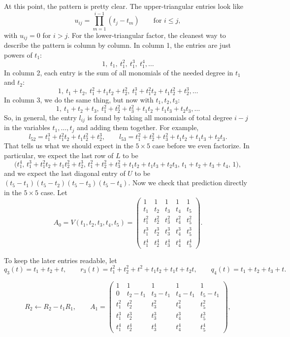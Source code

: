 \documentclass[10pt]{extarticle}
\begin{document}
At this point, the pattern is pretty clear. The upper-triangular entries look like
\begin{equation}
u_{ij}=\prod_{m=1}^{i-1}(t_j-t_m)\qquad \text{for } i\le j,
\label{eq:vander-u}
\end{equation}
with $u_{ij}=0$ for $i>j$. For the lower-triangular factor, the cleanest way to describe the pattern is column by column. In column 1, the entries are just powers of $t_1$:
\[
1,\ t_1,\ t_1^2,\ t_1^3,\ t_1^4,\dots
\]
In column 2, each entry is the sum of all monomials of the needed degree in $t_1$ and $t_2$:
\[
1,\ t_1+t_2,\ t_1^2+t_1t_2+t_2^2,\ t_1^3+t_1^2t_2+t_1t_2^2+t_2^3,\dots
\]
In column 3, we do the same thing, but now with $t_1,t_2,t_3$:
\[
1,\ t_1+t_2+t_3,\ t_1^2+t_2^2+t_3^2+t_1t_2+t_1t_3+t_2t_3,\dots
\]
So, in general, the entry $l_{ij}$ is found by taking all monomials of total degree $i-j$ in the variables $t_1,\dots,t_j$ and adding them together. For example,
\[
l_{52}=t_1^3+t_1^2t_2+t_1t_2^2+t_2^3,
\qquad
l_{53}=t_1^2+t_2^2+t_3^2+t_1t_2+t_1t_3+t_2t_3.
\]
That tells us what we should expect in the $5\times5$ case before we even factorize. In particular, we expect the last row of $L$ to be
\[
\bigl(t_1^4,\,
t_1^3+t_1^2t_2+t_1t_2^2+t_2^3,\,
t_1^2+t_2^2+t_3^2+t_1t_2+t_1t_3+t_2t_3,\,
t_1+t_2+t_3+t_4,\,
1\bigr),
\]
and we expect the last diagonal entry of $U$ to be $(t_5-t_1)(t_5-t_2)(t_5-t_3)(t_5-t_4)$. Now we check that prediction directly in the $5\times5$ case. Let
\begingroup
\small
\[
A_0=V(t_1,t_2,t_3,t_4,t_5)=
\begin{pmatrix}
1 & 1 & 1 & 1 & 1\\
t_1 & t_2 & t_3 & t_4 & t_5\\
t_1^2 & t_2^2 & t_3^2 & t_4^2 & t_5^2\\
t_1^3 & t_2^3 & t_3^3 & t_4^3 & t_5^3\\
t_1^4 & t_2^4 & t_3^4 & t_4^4 & t_5^4
\end{pmatrix}.
\]

To keep the later entries readable, let
\[
q_3(t)=t_1+t_2+t,\qquad
r_3(t)=t_1^2+t_2^2+t^2+t_1t_2+t_1t+t_2t,\qquad
q_4(t)=t_1+t_2+t_3+t.
\]

\[
R_2\leftarrow R_2-t_1R_1,
\qquad
A_1=
\begin{pmatrix}
1 & 1 & 1 & 1 & 1\\
0 & t_2-t_1 & t_3-t_1 & t_4-t_1 & t_5-t_1\\
t_1^2 & t_2^2 & t_3^2 & t_4^2 & t_5^2\\
t_1^3 & t_2^3 & t_3^3 & t_4^3 & t_5^3\\
t_1^4 & t_2^4 & t_3^4 & t_4^4 & t_5^4
\end{pmatrix},
\]
\end{document}
